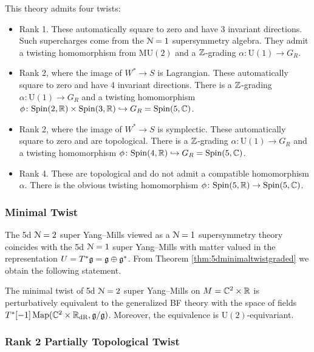 \documentclass[10pt, oneside]{article}
\newcommand{\MU}{\mathrm{MU}}
\renewcommand{\U}{\mathrm{U}}
\begin{document}
This theory admits four twists:
\begin{itemize}
\item Rank 1. These automatically square to zero and have 3 invariant directions. Such supercharges come from the $\mathcal N=1$ supersymmetry algebra. They admit a twisting homomorphism from $\MU(2)$ and a $\mathbb Z$-grading $\alpha\colon \U(1)\rightarrow G_R$.

\item Rank 2, where the image of $W^*\rightarrow S$ is Lagrangian. These automatically square to zero and have 4 invariant directions. There is a $\mathbb Z$-grading $\alpha\colon \U(1)\rightarrow G_R$ and a twisting homomorphism $\phi\colon \mathrm{Spin}(2, \mathbb R)\times \mathrm{Spin}(3, \mathbb R)\hookrightarrow G_R=\mathrm{Spin}(5, \mathbb C)$.

\item Rank 2, where the image of $W^*\rightarrow S$ is symplectic. These automatically square to zero and are topological. There is a $\mathbb Z$-grading $\alpha\colon \U(1)\rightarrow G_R$ and a twisting homomorphism $\phi\colon \mathrm{Spin}(4, \mathbb R)\hookrightarrow G_R=\mathrm{Spin}(5, \mathbb C)$.

\item Rank 4. These are topological and do not admit a compatible homomorphism $\alpha$. There is the obvious twisting homomorphism $\phi\colon \mathrm{Spin}(5, \mathbb R)\rightarrow \mathrm{Spin}(5, \mathbb C)$.
\end{itemize}

\subsubsection{Minimal Twist}
\label{sect:5dminimaltwist}

The 5d $\mathcal N=2$ super Yang--Mills viewed as a $\mathcal N=1$ supersymmetry theory coincides with the 5d $\mathcal N=1$ super Yang--Mills with matter valued in the representation $U=T^*\mathfrak g=\mathfrak g\oplus \mathfrak g^*$. From Theorem \ref{thm:5dminimaltwistgraded} we obtain the following statement.

\begin{theorem}
The minimal twist of 5d $\mathcal N=2$ super Yang--Mills on $M=\mathbb C^2\times \mathbb R$ is perturbatively equivalent to the generalized BF theory with the space of fields $T^*[-1]\operatorname{Map}(\mathbb C^2\times \mathbb R_{\mathrm{dR}}, \mathfrak g/\mathfrak g)$. Moreover, the equivalence is $\U(2)$-equivariant.
\end{theorem}

\subsubsection{Rank 2 Partially Topological Twist}
\label{sect:5dpartialtwist}
\end{document}

